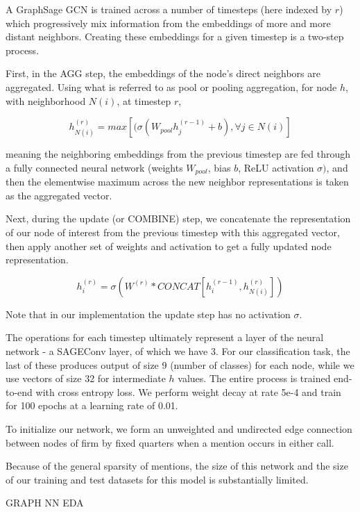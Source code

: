 \documentclass{article}[11pt]
\begin{document}

    A GraphSage GCN is trained across a number of timesteps (here indexed by $r$) which progressively mix information from the embeddings of more and more distant neighbors. Creating these embeddings for a given timestep is a two-step process.

    First, in the AGG step, the embeddings of the node's direct neighbors are aggregated. Using what is referred to as pool or pooling aggregation, for node $h$, with neighborhood $N(i)$, at timestep $r$,

    \[
    h_{N(i)}^{(r)}=max[(\sigma(W_{pool}h_{j}^{(r-1)}+b),\forall j\in N(i)]
    \]

    meaning the neighboring embeddings from the previous timestep are fed through a fully connected neural network (weights $W_{pool}$, bias $b$, ReLU activation $\sigma)$, and then the elementwise maximum across the new neighbor representations is taken as the aggregated vector.

    Next, during the update (or COMBINE) step, we concatenate the representation of our node of interest from the previous timestep with this aggregated vector, then apply another set of weights and activation to get a fully updated node representation.

    \[
    h_{i}^{(r)}=\sigma(W^{(r)}*CONCAT[h_{i}^{(r-1)},h_{N(i)}^{(r)}])
    \]

    Note that in our implementation the update step has no activation $\sigma$.

    The operations for each timestep ultimately represent a layer of the neural network - a SAGEConv layer, of which we have 3. For our classification task, the last of these produces output of size 9 (number of classes) for each node, while we use vectors of size 32 for intermediate $h$ values. The entire process is trained end-to-end with cross entropy loss. We perform weight decay at rate 5e-4 and train for 100 epochs at a learning rate of 0.01.


    To initialize our network, we form an unweighted and undirected edge connection between nodes of firm by fixed quarters when a mention occurs in either call.

    Because of the general sparsity of mentions, the size of this network and the size of our training and test datasets for this model is substantially limited.

    GRAPH NN EDA
\end{document}
